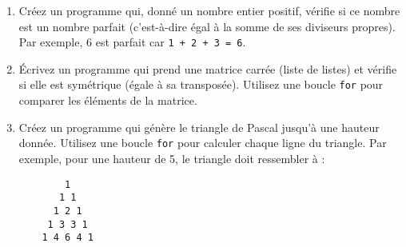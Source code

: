 \begin{enumerate}
    \item Créez un programme qui, donné un nombre entier positif, vérifie si ce nombre est un nombre parfait (c'est-à-dire égal à la somme de ses diviseurs propres). Par exemple, 6 est parfait car \texttt{1 + 2 + 3 = 6}.

    \item Écrivez un programme qui prend une matrice carrée (liste de listes) et vérifie si elle est symétrique (égale à sa transposée). Utilisez une boucle \texttt{for} pour comparer les éléments de la matrice.

    \item Créez un programme qui génère le triangle de Pascal jusqu'à une hauteur donnée. Utilisez une boucle \texttt{for} pour calculer chaque ligne du triangle. Par exemple, pour une hauteur de 5, le triangle doit ressembler à :
    \begin{verbatim}
        1
       1 1
      1 2 1
     1 3 3 1
    1 4 6 4 1
    \end{verbatim}

\end{enumerate}
